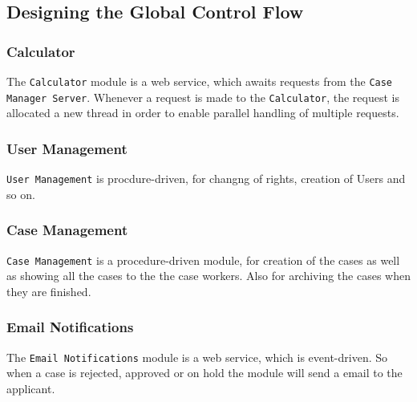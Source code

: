 \subsection{Designing the Global Control Flow}

\subsubsection{Calculator}
The \texttt{Calculator} module is a web service, which awaits requests from the \texttt{Case Manager Server}. Whenever a request is made to the \texttt{Calculator}, the request is allocated a new thread in order to enable parallel handling of multiple requests.

\subsubsection{User Management}
\texttt{User Management} is procdure-driven, for changng of rights, creation of Users and so on.

\subsubsection{Case Management}
\texttt{Case Management} is a procedure-driven module, for creation of the cases as well as showing all the cases to the the case workers. Also for archiving the cases when they are finished.

\subsubsection{Email Notifications}
The \texttt{Email Notifications} module is a web service, which is event-driven. So when a case is rejected, approved or on hold the module will send a email to the applicant.